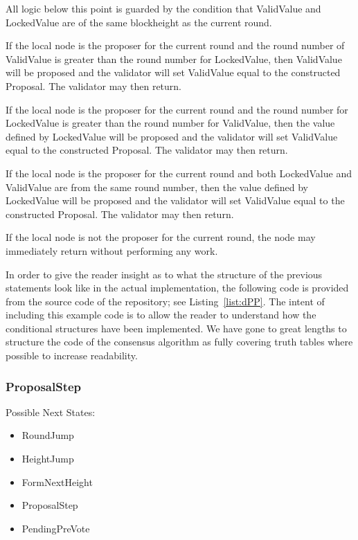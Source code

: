 All logic below this point is guarded by the condition that ValidValue
and LockedValue are of the same blockheight as the current round.

If the local node is the proposer for the current round and the round
number of ValidValue is greater than the round number for LockedValue,
then ValidValue will be proposed and the validator will set ValidValue
equal to the constructed Proposal.
The validator may then return.

If the local node is the proposer for the current round and the round
number for LockedValue is greater than the round number for ValidValue,
then the value defined by LockedValue will be proposed and the
validator will set ValidValue equal to the constructed Proposal.
The validator may then return.

If the local node is the proposer for the current round and both
LockedValue and ValidValue are from the same round number, then the
value defined by LockedValue will be proposed and the validator will
set ValidValue equal to the constructed Proposal.
The validator may then return.

If the local node is not the proposer for the current round, the node
may immediately return without performing any work.

In order to give the reader insight as to what the structure of the
previous statements look like in the actual implementation, the
following code is provided from the source code of the \LayerTwoLong{}
repository; see Listing~\ref{list:dPP}.
The intent of including this example code is to allow the reader to
understand how the conditional structures have been implemented.
We have gone to great lengths to structure the code of the consensus
algorithm as fully covering truth tables where possible to increase
readability.




\subsubsection{ProposalStep}

Possible Next States:

\begin{itemize}
    \item RoundJump
    \item HeightJump
    \item FormNextHeight
    \item ProposalStep
    \item PendingPreVote
\end{itemize}

